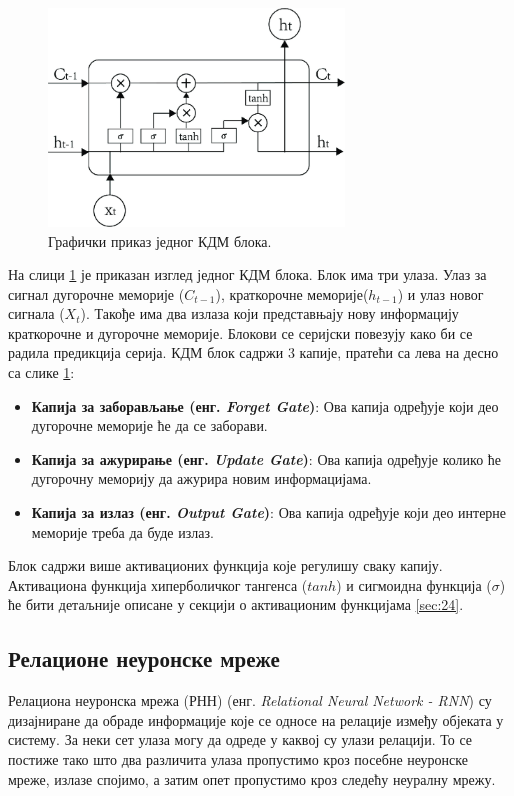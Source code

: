 \documentclass[a4paper, 12pt, master, utf8]{etf}
\begin{document}
\begin{figure}[h]
    \centering
    \includegraphics[width=0.7\textwidth]{images/LSTM.png}
    \caption{Графички приказ једног КДМ блока. \cite{qiu_forecasting_2020}}
    \label{fig:LSTM}
\end{figure}

На слици \ref{fig:LSTM} је приказан изглед једног КДМ блока. Блок има три улаза. Улаз за сигнал дугорочне меморије ($C_{t-1}$), краткорочне меморије($h_{t-1}$) и улаз новог сигнала ($X_t$). Такође има два излаза који представњају нову информацију краткорочне и дугорочне меморије.
Блокови се серијски повезују како би се радила предикција серија. КДМ блок садржи 3 капије, пратећи са лева на десно са слике \ref{fig:LSTM}:

\begin{itemize}[noitemsep]
    \item \textbf{Капија за заборављање (енг. \textit{Forget Gate})}: Ова капија одређује који део дугорочне меморије ће да се заборави.
    \item \textbf{Капија за ажурирање (енг. \textit{Update Gate})}: Ова капија одређује колико ће дугорочну меморију да ажурира новим информацијама.
    \item  \textbf{Капија за излаз (енг. \textit{Output Gate})}: Ова капија одређује који део интерне меморије треба да буде излаз.
\end{itemize}

Блок садржи више активационих функција које регулишу сваку капију. Активациона функција хиперболичког тангенса ($tanh$) и сигмоидна функција ($\sigma$) ће бити детаљније описане у секцији о активационим функцијама \ref{sec:24}.

\subsection{Релационе неуронске мреже}
\label{sec:234}
Релациона неуронска мрежа (РНН) (енг. \textit{Relational Neural Network - RNN}) су дизајниране да обраде информације које се односе на релације између објеката у систему. За неки сет улаза могу да одреде у каквој су улази релацији.
То се постиже тако што два различита улаза пропустимо кроз посебне неуронске мреже, излазе спојимо, а затим опет пропустимо кроз следећу неуралну мрежу.
\end{document}

